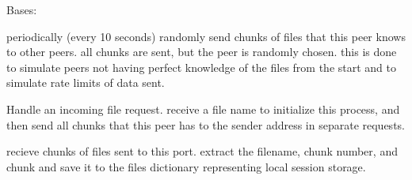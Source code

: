 \documentclass[letterpaper,10pt,english,openany,oneside]{sphinxmanual}
\begin{document}
\begin{fulllineitems}
\label{\detokenize{index:transfer.FileTransfer}}
\pysigstartsignatures
\pysiglinewithargsret
{}
{\sphinxparamcomma {}\sphinxparamcomma {}}
{}
\pysigstopsignatures
\sphinxAtStartPar
Bases: 

\begin{fulllineitems}
\label{\detokenize{index:transfer.FileTransfer.distribute_files}}
\pysigstartsignatures
\pysiglinewithargsret
{}
{}
{}
\pysigstopsignatures
\sphinxAtStartPar
periodically (every 10 seconds) randomly send chunks of files that this peer knows to other peers.
all chunks are sent, but the peer is randomly chosen. this is done to simulate peers not having perfect knowledge
of the files from the start and to simulate rate limits of data sent.

\end{fulllineitems}


\begin{fulllineitems}
\label{\detokenize{index:transfer.FileTransfer.handle_client}}
\pysigstartsignatures
\pysiglinewithargsret
{}
{}
{}
\pysigstopsignatures
\sphinxAtStartPar
Handle an incoming file request. receive a file name to initialize this process, and then send all
chunks that this peer has to the sender address in separate requests.

\end{fulllineitems}


\begin{fulllineitems}
\label{\detokenize{index:transfer.FileTransfer.receive_distributed_files}}
\pysigstartsignatures
\pysiglinewithargsret
{}
{}
{}
\pysigstopsignatures
\sphinxAtStartPar
recieve chunks of files sent to this port. extract the filename, chunk number, and chunk and save it to the
files dictionary representing local session storage.


\end{fulllineitems}
\end{fulllineitems}
\end{document}
